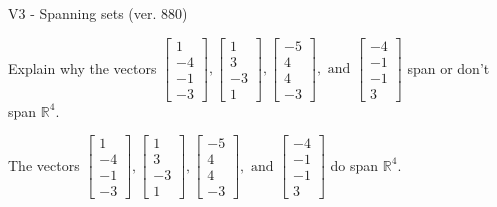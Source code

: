 \begin{exercise}
  \begin{exerciseTitle}V3 - Spanning sets (ver. 880)\end{exerciseTitle}
  \begin{exerciseStatement}
    Explain why the vectors \(\left[\begin{array}{r}
1 \\
-4 \\
-1 \\
-3
\end{array}\right] , \left[\begin{array}{r}
1 \\
3 \\
-3 \\
1
\end{array}\right] , \left[\begin{array}{r}
-5 \\
4 \\
4 \\
-3
\end{array}\right] , \text{ and } \left[\begin{array}{r}
-4 \\
-1 \\
-1 \\
3
\end{array}\right]\) span or don't span \(\mathbb{R}^4\). 
	


  \end{exerciseStatement}
  \begin{exerciseAnswer}
   The vectors \(\left[\begin{array}{r}
1 \\
-4 \\
-1 \\
-3
\end{array}\right] , \left[\begin{array}{r}
1 \\
3 \\
-3 \\
1
\end{array}\right] , \left[\begin{array}{r}
-5 \\
4 \\
4 \\
-3
\end{array}\right] , \text{ and } \left[\begin{array}{r}
-4 \\
-1 \\
-1 \\
3
\end{array}\right]\) 
  	 do  
	span \(\mathbb{R}^4\).
  


  \end{exerciseAnswer}
\end{exercise}